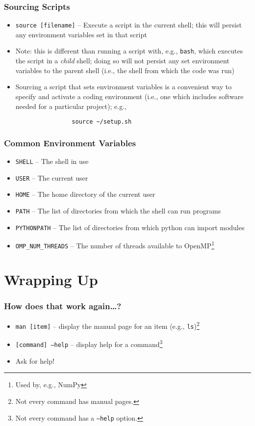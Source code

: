 \documentclass[aspectratio=169]{beamer}
\begin{document}
\begin{frame}[fragile]
	\frametitle{Sourcing Scripts}
	\begin{itemize}
		\item \texttt{source [filename]} -- Execute a script in the current shell; this will persist any environment variables set in that script
		\item Note: this is different than running a script with, e.g., \texttt{bash}, which executes the script in a \emph{child} shell; doing so will not persist any set environment variables to the parent shell (i.e., the shell from which the code was run)
		\item Sourcing a script that sets environment variables is a convenient way to specify and activate a coding environment (i.e., one which includes software needed for a particular project); e.g.,
			\begin{verbatim}
				source ~/setup.sh
			\end{verbatim}
	\end{itemize}
\end{frame}

\begin{frame}
	\frametitle{Common Environment Variables}
	\begin{itemize}
		\item \texttt{SHELL} -- The shell in use
		\item \texttt{USER} -- The current user
		\item \texttt{HOME} -- The home directory of the current user
		\item \texttt{PATH} -- The list of directories from which the shell can run programs
		\item \texttt{PYTHONPATH} -- The list of directories from which python can import modules
		\item \texttt{OMP\_NUM\_THREADS} -- The number of threads available to OpenMP\footnote{Used by, e.g., NumPy}
	\end{itemize}
\end{frame}


\section{Wrapping Up}

\frame{\sectionpage}

\begin{frame}
	\frametitle{How does that work again\dots?}
	\begin{itemize}
		\item \texttt{man [item]} -- display the manual page for an item (e.g., \texttt{ls})\footnote{Not every command has manual pages.}
		\item \texttt{[command] --help} -- display help for a command\footnote{Not every command has a \texttt{--help} option.}
		\item Ask for help!
	\end{itemize}
\end{frame}
\end{document}
